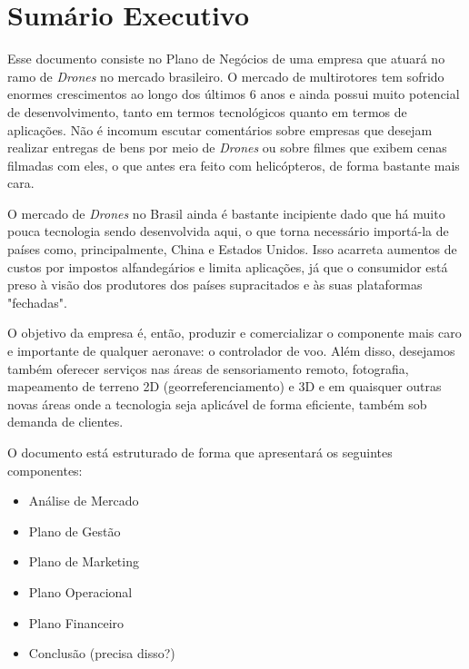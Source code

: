\section{Sumário Executivo}

Esse documento consiste no Plano de Negócios de uma empresa que atuará
no ramo de \emph{Drones} no mercado brasileiro. O mercado de multirotores
tem sofrido enormes crescimentos ao longo dos últimos 6 anos e ainda possui
muito potencial de desenvolvimento, tanto em termos tecnológicos quanto em
termos de aplicações. Não é incomum escutar comentários sobre empresas que
desejam realizar entregas de bens por meio de \emph{Drones} ou sobre filmes
que exibem cenas filmadas com eles, o que antes era feito com helicópteros,
de forma bastante mais cara.

O mercado de \emph{Drones} no Brasil ainda é bastante incipiente dado que
há muito pouca tecnologia sendo desenvolvida aqui, o que torna necessário
importá-la de países como, principalmente, China e Estados Unidos.
Isso acarreta aumentos de custos por impostos alfandegários e limita
aplicações, já que o consumidor está preso à visão dos produtores dos países
supracitados e às suas plataformas "fechadas".

O objetivo da empresa é, então, produzir e comercializar o componente mais caro 
e importante de qualquer aeronave: o controlador de voo. Além disso, desejamos
também oferecer serviços nas áreas de sensoriamento remoto, fotografia, mapeamento
de terreno 2D (georreferenciamento) e 3D e em quaisquer outras novas áreas onde
a tecnologia seja aplicável de forma eficiente, também sob demanda de clientes.

O documento está estruturado de forma que apresentará os seguintes componentes:

\begin{itemize}
	\item Análise de Mercado
	\item Plano de Gestão
	\item Plano de Marketing
	\item Plano Operacional
	\item Plano Financeiro
	\item Conclusão (precisa disso?)
\end{itemize}


